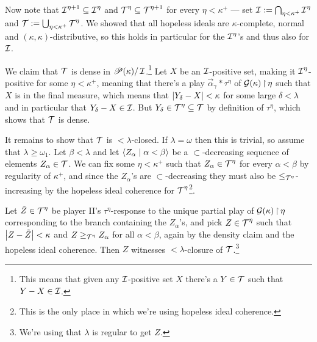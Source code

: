 \documentclass[../../main]{subfiles}
\begin{document}
{\qquad Now note that $\operatorname{\mathcal I}^{\eta+1}\subseteq\operatorname{\mathcal I}^\eta$ and $\operatorname{\mathcal T}^\eta\subseteq\operatorname{\mathcal T}^{\eta+1}$ for every $\eta<\kappa^+$ --- set $\operatorname{\mathcal I}:=\bigcap_{\eta<\kappa^+}\operatorname{\mathcal I}^\eta$ and $\operatorname{\mathcal T}:=\bigcup_{\eta<\kappa^+}\operatorname{\mathcal T}^\eta$. We showed that all hopeless ideals are $\kappa$-complete, normal and $(\kappa,\kappa)$-distributive, so this holds in particular for the $\operatorname{\mathcal I}^\eta$'s and thus also for $\operatorname{\mathcal I}$.

\qquad We claim that $\operatorname{\mathcal T}$ is dense in $\mathscr P(\kappa)/\operatorname{\mathcal I}$.\footnote{This means that given any $\operatorname{\mathcal I}$-positive set $X$ there's a $Y\in\operatorname{\mathcal T}$ such that $Y-X\in\operatorname{\mathcal I}$.} Let $X$ be an $\operatorname{\mathcal I}$-positive set, making it $\operatorname{\mathcal I}^\eta$-positive for some $\eta<\kappa^+$, meaning that there's a play $\vec\alpha_\gamma*\tau^\eta$ of $\operatorname{\mathcal G}(\kappa)\operatorname{\upharpoonright}\eta$ such that $X$ is in the final measure, which means that $\left|Y_\delta-X\right|<\kappa$ for some large $\delta<\lambda$ and in particular that $Y_\delta-X\in\operatorname{\mathcal I}$. But $Y_\delta\in\operatorname{\mathcal T}^\eta\subseteq\operatorname{\mathcal T}$ by definition of $\tau^\eta$, which shows that $\operatorname{\mathcal T}$ is dense.

\qquad It remains to show that $\operatorname{\mathcal T}$ is ${<}\lambda$-closed. If $\lambda=\omega$ then this is trivial, so assume that $\lambda\geq\omega_1$. Let $\beta<\lambda$ and let $\langle Z_\alpha\mid\alpha<\beta\rangle$ be a $\subset$-decreasing sequence of elements $Z_\alpha\in\operatorname{\mathcal T}$. We can fix some $\eta<\kappa^+$ such that $Z_\alpha\in\operatorname{\mathcal T}^\eta$ for every $\alpha<\beta$ by regularity of $\kappa^+$, and since the $Z_\alpha$'s are $\subset$-decreasing they must also be $\leq_{\operatorname{\mathcal T}^\eta}$-increasing by the hopeless ideal coherence for $\operatorname{\mathcal T}^\eta$\footnote{This is the only place in which we're using hopeless ideal coherence.}.
	
\qquad Let $\tilde Z\in\operatorname{\mathcal T}^\eta$ be player II's $\tau^\eta$-response to the unique partial play of $\operatorname{\mathcal G}(\kappa)\operatorname{\upharpoonright}\eta$ corresponding to the branch containing the $Z_\alpha$'s, and pick $Z\in\operatorname{\mathcal T}^\eta$ such that $\left|Z-\tilde Z\right|<\kappa$ and $Z\geq_{\operatorname{\mathcal T}^\eta}Z_\alpha$ for all $\alpha<\beta$, again by the density claim and the hopeless ideal coherence. Then $Z$ witnesses ${<}\lambda$-closure of $\operatorname{\mathcal T}$.\footnote{We're using that $\lambda$ is regular to get $Z$.}
}
\end{document}

